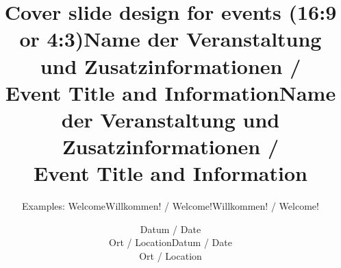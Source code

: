 \documentclass[aspectratio=169]{beamer}
\begin{document}

\begin{frame}[plain]
  \subtitle{Examples: Welcome}
  \title{Cover slide design for events (16:9 or 4:3)}
  \makewelcome
\end{frame}


\begin{frame}[plain]
  \subtitle{Willkommen! / Welcome!}
  \title{Name der Veranstaltung und Zusatzinformationen / \\ Event Title and Information}
  \date{Datum / Date \\
        Ort / Location}

  \makewelcome
\end{frame}


\begin{frame}[plain]
  \ifwide %
  \else %
  \fi

  \subtitle{Willkommen! / Welcome!}
  \title{Name der Veranstaltung und Zusatzinformationen / \\ Event Title and Information}
  \date{Datum / Date \\
        Ort / Location}

  \makewelcome

\end{frame}
\end{document}
